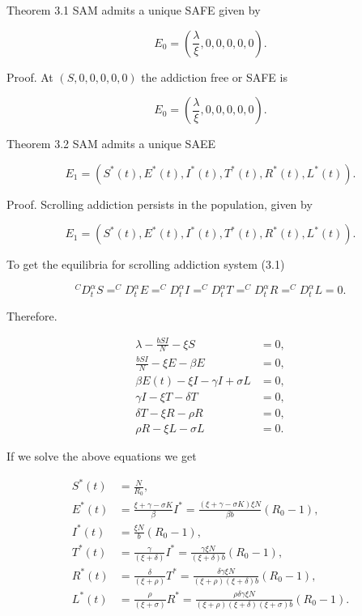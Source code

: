 \documentclass[10pt]{NSP1}
\begin{document}
Theorem 3.1 SAM admits a unique SAFE given by

\[
E_{0} = \left( \frac{\lambda}{\xi},0,0,0,0,0 \right).
\]

Proof. At \((S,0,0,0,0,0)\) the addiction free or SAFE is

\[
E_{0} = \left( \frac{\lambda}{\xi},0,0,0,0,0 \right).
\]

Theorem 3.2 SAM admits a unique SAEE

\[
E_{1} = \left( S^{*}(t),E^{*}(t),I^{*}(t),T^{*}(t),R^{*}(t),L^{*}(t) \right).
\]

Proof. Scrolling addiction persists in the population, given by

\[
E_{1} = \left( S^{*}(t),E^{*}(t),I^{*}(t),T^{*}(t),R^{*}(t),L^{*}(t) \right).
\]

To get the equilibria for scrolling addiction system (3.1)

\[
^{C}D_{t}^{\alpha}S =^{C}D_{t}^{\alpha}E =^{C}D_{t}^{\alpha}I =^{C}D_{t}^{\alpha}T =^{C}D_{t}^{\alpha}R =^{C}D_{t}^{\alpha}L = 0.
\]

Therefore.

\[
\begin{matrix}
\lambda - \frac{bSI}{N} - \xi S & = 0, \\
\frac{bSI}{N} - \xi E - \beta E & = 0, \\
\beta E(t) - \xi I - \gamma I + \sigma L & = 0, \\
\gamma I - \xi T - \delta T & = 0, \\
\delta T - \xi R - \rho R & = 0, \\
\rho R - \xi L - \sigma L & = 0.
\end{matrix}
\]

If we solve the above equations we get

\[
\begin{matrix}
S^{*}(t) & = \frac{N}{R_{0}}, \\
E^{*}(t) & = \frac{\xi + \gamma - \sigma K}{\beta}I^{*} = \frac{(\xi + \gamma - \sigma K)\xi N}{\beta b}\left( R_{0} - 1 \right), \\
I^{*}(t) & = \frac{\xi N}{b}\left( R_{0} - 1 \right), \\
T^{*}(t) & = \frac{\gamma}{(\xi + \delta)}I^{*} = \frac{\gamma\xi N}{(\xi + \delta)b}\left( R_{0} - 1 \right), \\
R^{*}(t) & = \frac{\delta}{(\xi + \rho)}T^{*} = \frac{\delta\gamma\xi N}{(\xi + \rho)(\xi + \delta)b}\left( R_{0} - 1 \right), \\
L^{*}(t) & = \frac{\rho}{(\xi + \sigma)}R^{*} = \frac{\rho\delta\gamma\xi N}{(\xi + \rho)(\xi + \delta)(\xi + \sigma)b}\left( R_{0} - 1 \right).
\end{matrix}
\]
\end{document}
